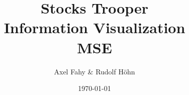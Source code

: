 \documentclass[11pt]{report}
\begin{document}
\title{Stocks Trooper\\Information Visualization\\MSE}
\date{\today}
\author{Axel Fahy \& Rudolf Höhn}
\maketitle

\tableofcontents

\pagestyle{fancy}     %









\appendix


\end{document}
